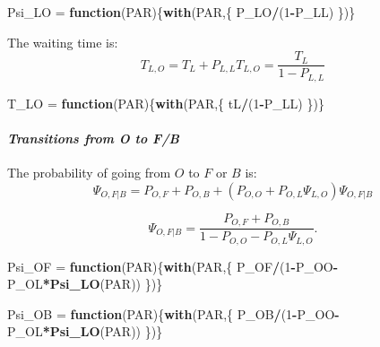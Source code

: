 \documentclass[]{article}
\newenvironment{Shaded}{\begin{snugshade}}{\end{snugshade}}
\newcommand{\ControlFlowTok}[1]{\textcolor[rgb]{0.13,0.29,0.53}{\textbf{#1}}}
\newcommand{\DecValTok}[1]{\textcolor[rgb]{0.00,0.00,0.81}{#1}}
\newcommand{\KeywordTok}[1]{\textcolor[rgb]{0.13,0.29,0.53}{\textbf{#1}}}
\newcommand{\NormalTok}[1]{#1}
\newcommand{\OperatorTok}[1]{\textcolor[rgb]{0.81,0.36,0.00}{\textbf{#1}}}
\newcommand{\StringTok}[1]{\textcolor[rgb]{0.31,0.60,0.02}{#1}}
\let\oldparagraph\paragraph
\renewcommand{\paragraph}[1]{\oldparagraph{#1}\mbox{}}
\begin{document}
\begin{Shaded}
\begin{Highlighting}[]
\NormalTok{Psi_LO =}\StringTok{ }\ControlFlowTok{function}\NormalTok{(PAR)\{}\KeywordTok{with}\NormalTok{(PAR,\{}
\NormalTok{  P_LO}\OperatorTok{/}\NormalTok{(}\DecValTok{1}\OperatorTok{-}\NormalTok{P_LL)}
\NormalTok{\})\}}
\end{Highlighting}
\end{Shaded}

The waiting time is:
\[T_{L,O}  = T_L + P_{L,L} T_{L,O} = \frac{T_L}{1-P_{L,L}} \]

\begin{Shaded}
\begin{Highlighting}[]
\NormalTok{T_LO =}\StringTok{ }\ControlFlowTok{function}\NormalTok{(PAR)\{}\KeywordTok{with}\NormalTok{(PAR,\{}
\NormalTok{  tL}\OperatorTok{/}\NormalTok{(}\DecValTok{1}\OperatorTok{-}\NormalTok{P_LL)}
\NormalTok{\})\}}
\end{Highlighting}
\end{Shaded}

\hypertarget{transitions-from-o-to-fb}{%
\paragraph{\texorpdfstring{\emph{Transitions from O to
F/B}}{Transitions from O to F/B}}\label{transitions-from-o-to-fb}}

The probability of going from \(O\) to \(F\) or \(B\) is:
\[\Psi_{O,F|B} = P_{O,F} + P_{O,B} + \left(P_{O,O} + P_{O,L} \Psi_{L,O} \right) \Psi_{O,F|B} \]

\[ \Psi_{O,F|B} = \frac{P_{O,F}+ P_{O,B}}{1-P_{O,O} - P_{O,L} \Psi_{L,O}}.\]

\begin{Shaded}
\begin{Highlighting}[]
\NormalTok{Psi_OF =}\StringTok{ }\ControlFlowTok{function}\NormalTok{(PAR)\{}\KeywordTok{with}\NormalTok{(PAR,\{}
\NormalTok{  P_OF}\OperatorTok{/}\NormalTok{(}\DecValTok{1}\OperatorTok{-}\NormalTok{P_OO}\OperatorTok{-}\NormalTok{P_OL}\OperatorTok{*}\KeywordTok{Psi_LO}\NormalTok{(PAR))}
\NormalTok{\})\}}

\NormalTok{Psi_OB =}\StringTok{ }\ControlFlowTok{function}\NormalTok{(PAR)\{}\KeywordTok{with}\NormalTok{(PAR,\{}
\NormalTok{  P_OB}\OperatorTok{/}\NormalTok{(}\DecValTok{1}\OperatorTok{-}\NormalTok{P_OO}\OperatorTok{-}\NormalTok{P_OL}\OperatorTok{*}\KeywordTok{Psi_LO}\NormalTok{(PAR))}
\NormalTok{\})\}}
\end{Highlighting}
\end{Shaded}
\end{document}
